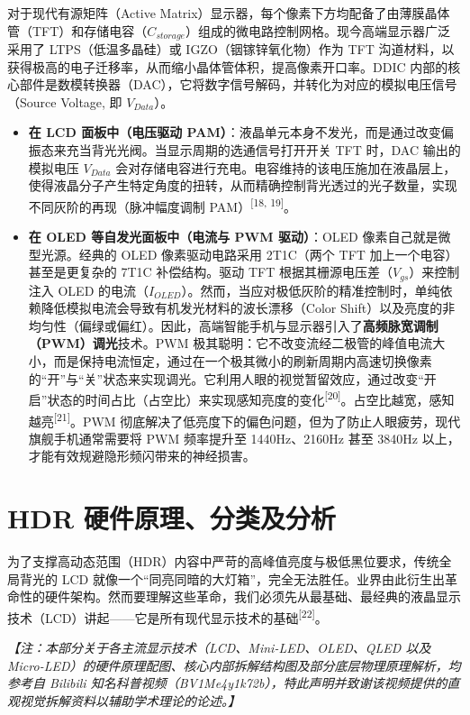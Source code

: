 \documentclass[12pt, a4paper]{ctexart}
\newcommand{\scite}[1]{\textsuperscript{[#1]}}
\begin{document}
对于现代有源矩阵（Active Matrix）显示器，每个像素下方均配备了由薄膜晶体管（TFT）和存储电容（$C_{storage}$）组成的微电路控制网格。现今高端显示器广泛采用了 LTPS（低温多晶硅）或 IGZO（铟镓锌氧化物）作为 TFT 沟道材料，以获得极高的电子迁移率，从而缩小晶体管体积，提高像素开口率。DDIC 内部的核心部件是数模转换器（DAC），它将数字信号解码，并转化为对应的模拟电压信号（Source Voltage, 即 $V_{Data}$）。

\begin{itemize}
    \item \textbf{在 LCD 面板中（电压驱动 PAM）}：液晶单元本身不发光，而是通过改变偏振态来充当背光光阀。当显示周期的选通信号打开开关 TFT 时，DAC 输出的模拟电压 $V_{Data}$ 会对存储电容进行充电。电容维持的该电压施加在液晶层上，使得液晶分子产生特定角度的扭转，从而精确控制背光透过的光子数量，实现不同灰阶的再现（脉冲幅度调制 PAM）\scite{18, 19}。
    \item \textbf{在 OLED 等自发光面板中（电流与 PWM 驱动）}：OLED 像素自己就是微型光源。经典的 OLED 像素驱动电路采用 2T1C（两个 TFT 加上一个电容）甚至是更复杂的 7T1C 补偿结构。驱动 TFT 根据其栅源电压差（$V_{gs}$）来控制注入 OLED 的电流（$I_{OLED}$）。然而，当应对极低灰阶的精准控制时，单纯依赖降低模拟电流会导致有机发光材料的波长漂移（Color Shift）以及亮度的非均匀性（偏绿或偏红）。因此，高端智能手机与显示器引入了\textbf{高频脉宽调制（PWM）调光}技术。PWM 极其聪明：它不改变流经二极管的峰值电流大小，而是保持电流恒定，通过在一个极其微小的刷新周期内高速切换像素的“开”与“关”状态来实现调光。它利用人眼的视觉暂留效应，通过改变“开启”状态的时间占比（占空比）来实现感知亮度的变化\scite{20}。占空比越宽，感知越亮\scite{21}。PWM 彻底解决了低亮度下的偏色问题，但为了防止人眼疲劳，现代旗舰手机通常需要将 PWM 频率提升至 1440Hz、2160Hz 甚至 3840Hz 以上，才能有效规避隐形频闪带来的神经损害。
\end{itemize}

\newpage
\section{HDR 硬件原理、分类及分析}

为了支撑高动态范围（HDR）内容中严苛的高峰值亮度与极低黑位要求，传统全局背光的 LCD 就像一个“同亮同暗的大灯箱”，完全无法胜任。业界由此衍生出革命性的硬件架构。然而要理解这些革命，我们必须先从最基础、最经典的液晶显示技术（LCD）讲起——它是所有现代显示技术的基础\scite{22}。

\textit{【注：本部分关于各主流显示技术（LCD、Mini-LED、OLED、QLED 以及 Micro-LED）的硬件原理配图、核心内部拆解结构图及部分底层物理原理解析，均参考自 Bilibili 知名科普视频（BV1Me4y1k72b），特此声明并致谢该视频提供的直观视觉拆解资料以辅助学术理论的论述。】}
\end{document}
